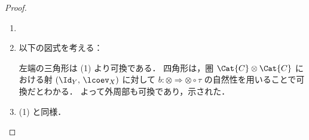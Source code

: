 \documentclass[TQFT_main]{subfiles}
\begin{document}
\begin{proof}
    \begin{enumerate}
        \item ~\cite[EXERCISE 8.1.6, p.196]{etingof2015tensor}
        \item 以下の図式を考える：
        \begin{center}
        \end{center}
        左端の三角形は (1) より可換である．
        四角形は，圏 $\Cat{C} \otimes \Cat{C}$ における射 $(\Id_Y,\, \lcoev_X)$ に対して $b \colon \otimes \Longrightarrow \otimes \circ \tau$ の自然性を用いることで可換だとわかる．
        よって外周部も可換であり，示された．
        \item (1) と同様．
    \end{enumerate}
\end{proof}
\end{document}
